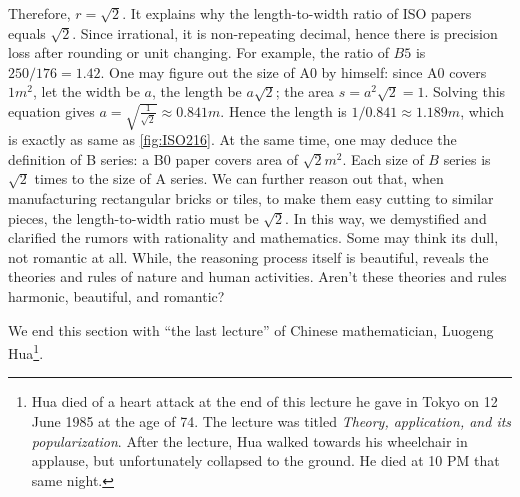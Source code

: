 \documentclass[b5paper]{article}
\begin{document}
Therefore, $r = \sqrt{2}$. It explains why the length-to-width ratio of ISO papers equals $\sqrt{2}$. Since irrational, it is non-repeating decimal, hence there is precision loss after rounding or unit changing. For example, the ratio of $B5$ is $250/176 = 1.42$. One may figure out the size of A0 by himself: since A0 covers $1 m^2$, let the width be $a$, the length be $a\sqrt{2}$; the area $s = a^2\sqrt{2} = 1$. Solving this equation gives $a = \sqrt{\frac{1}{\sqrt{2}}} \approx 0.841 m$. Hence the length is $1 / 0.841 \approx 1.189 m$, which is exactly as same as \cref{fig:ISO216}. At the same time, one may deduce the definition of B series: a B0 paper covers area of $\sqrt{2} m^2$. Each size of $B$ series is $\sqrt{2}$ times to the size of A series. We can further reason out that, when manufacturing rectangular bricks or tiles, to make them easy cutting to similar pieces, the length-to-width ratio must be $\sqrt{2}$. In this way, we demystified and clarified the rumors with rationality and mathematics. Some may think its dull, not romantic at all. While, the reasoning process itself is beautiful, reveals the theories and rules of nature and human activities. Aren't these theories and rules harmonic, beautiful, and romantic?

 
We end this section with \enquote{the last lecture} of Chinese mathematician, Luogeng Hua\footnote{Hua died of a heart attack at the end of this lecture he gave in Tokyo on 12 June 1985 at the age of 74. The lecture was titled \emph{Theory, application, and its popularization}. After the lecture, Hua walked towards his wheelchair in applause, but unfortunately collapsed to the ground. He died at 10 PM that same night.}.
\end{document}
